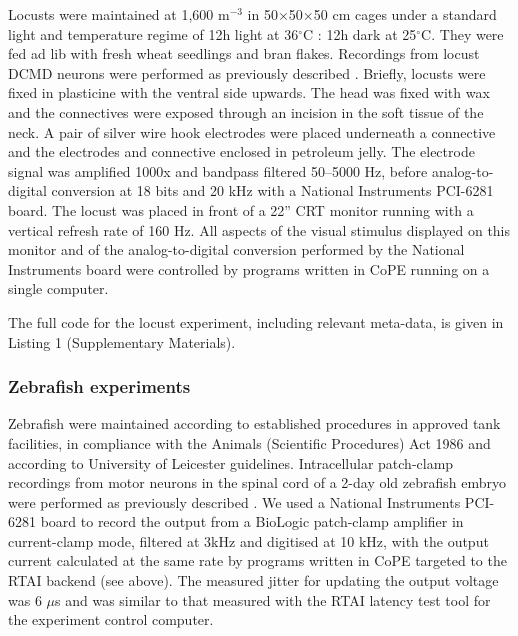 Locusts were maintained at 1,600 m$^{-3}$ in 50$\times$50$\times$50 cm cages under a
standard light and temperature regime of 12h light at 36$^{\circ}$C : 12h dark
at 25$^{\circ}$C. They were fed ad lib with fresh wheat seedlings and bran
flakes. Recordings from locust DCMD neurons were performed as
previously described \citep{Matheson2004}. Briefly, locusts were fixed
in plasticine with the ventral side upwards. The head was fixed with
wax
and the connectives were exposed through an
incision in the soft tissue of the neck. A pair of silver wire hook
electrodes were placed underneath a connective and the electrodes
and connective enclosed in petroleum jelly. The electrode signal was
amplified 1000x and bandpass filtered 50--5000 Hz, before
analog-to-digital conversion at 18 bits and 20 kHz with a National
Instruments PCI-6281 board. The locust was placed in front of a 22''
CRT monitor running with a vertical refresh rate of 160 Hz. All
aspects of the visual stimulus displayed on this monitor and of
the analog-to-digital conversion performed by the National Instruments
board were controlled by programs written in
CoPE running on a single computer.

The full code for the locust experiment, including relevant meta-data,
is given in Listing 1 (Supplementary Materials).

\subsubsection*{Zebrafish experiments}

Zebrafish were maintained according to established procedures
\citep{Westerfield1994} in approved tank facilities, in compliance
with the Animals (Scientific Procedures) Act 1986 and according to
University of Leicester guidelines. Intracellular patch-clamp
recordings from motor neurons in the spinal cord of a 2-day old
zebrafish embryo were performed as previously described
\citep{McDearmid2006}. We used a National Instruments PCI-6281 board
to record the output from a BioLogic patch-clamp amplifier in
current-clamp mode, filtered at 3kHz and digitised at 10 kHz, with the
output current calculated at the same rate by programs written in
CoPE targeted to the RTAI backend (see
above). The measured jitter for updating the output voltage was 6
$\mu$s and was similar to that measured with the RTAI latency test
tool for the experiment control computer.

